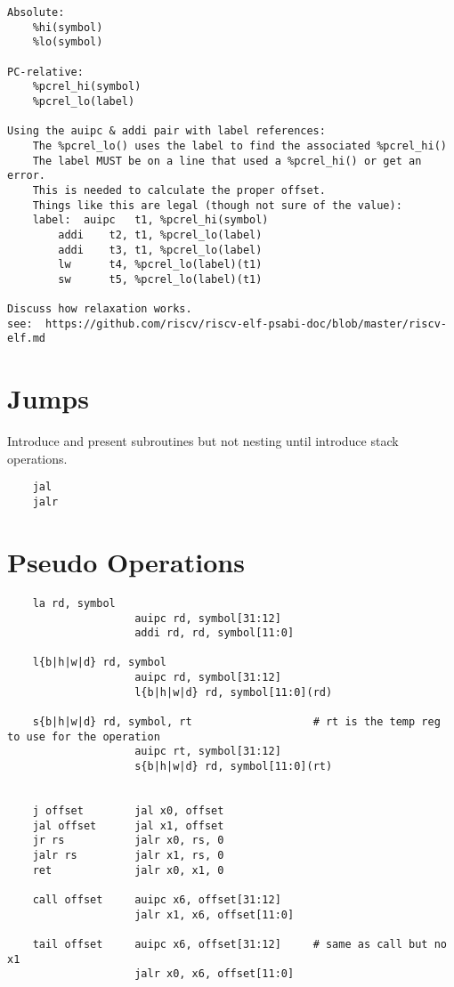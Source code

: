 \begin{verbatim}
Absolute:
    %hi(symbol)         
    %lo(symbol)         

PC-relative:
    %pcrel_hi(symbol)   
    %pcrel_lo(label)    

Using the auipc & addi pair with label references:
    The %pcrel_lo() uses the label to find the associated %pcrel_hi()
    The label MUST be on a line that used a %pcrel_hi() or get an error.
    This is needed to calculate the proper offset.
    Things like this are legal (though not sure of the value):
    label:  auipc   t1, %pcrel_hi(symbol)
        addi    t2, t1, %pcrel_lo(label)
        addi    t3, t1, %pcrel_lo(label)
        lw      t4, %pcrel_lo(label)(t1)
        sw      t5, %pcrel_lo(label)(t1)

Discuss how relaxation works.
see:  https://github.com/riscv/riscv-elf-psabi-doc/blob/master/riscv-elf.md
\end{verbatim}


\section{Jumps}

Introduce and present subroutines but not nesting until introduce stack operations.

\begin{verbatim}
    jal
    jalr
\end{verbatim}



\section{Pseudo Operations}

%
\begin{verbatim}
    la rd, symbol
                    auipc rd, symbol[31:12]
                    addi rd, rd, symbol[11:0]

    l{b|h|w|d} rd, symbol
                    auipc rd, symbol[31:12]
                    l{b|h|w|d} rd, symbol[11:0](rd)

    s{b|h|w|d} rd, symbol, rt                   # rt is the temp reg to use for the operation
                    auipc rt, symbol[31:12]
                    s{b|h|w|d} rd, symbol[11:0](rt)


    j offset        jal x0, offset
    jal offset      jal x1, offset
    jr rs           jalr x0, rs, 0
    jalr rs         jalr x1, rs, 0
    ret             jalr x0, x1, 0

    call offset     auipc x6, offset[31:12]
                    jalr x1, x6, offset[11:0]

    tail offset     auipc x6, offset[31:12]     # same as call but no x1
                    jalr x0, x6, offset[11:0]
\end{verbatim}


